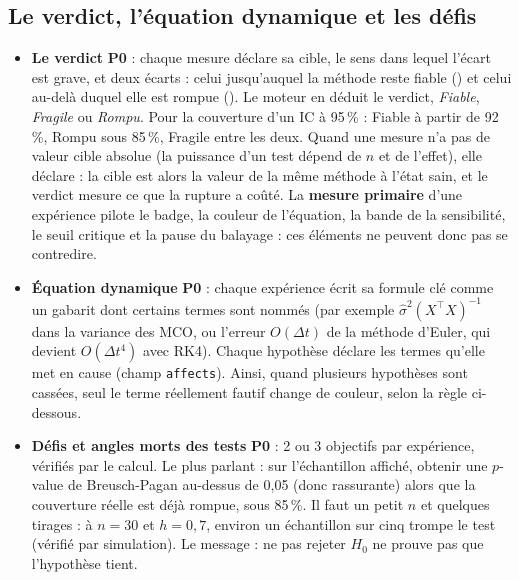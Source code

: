\documentclass[11pt,a4paper]{article}
\newcommand{\pzero}{\colorbox{ctCorrection!18}{\footnotesize\textbf{P0}}}
\begin{document}
\subsection{Le verdict, l'équation dynamique et les défis}\label{sec:verdict}
\begin{itemize}[leftmargin=*]
  \item \textbf{Le verdict} \pzero{} : chaque mesure déclare sa cible, le sens dans lequel l'écart est grave, et deux écarts : celui jusqu'auquel la méthode reste fiable () et celui au-delà duquel elle est rompue (). Le moteur en déduit le verdict, \emph{Fiable}, \emph{Fragile} ou \emph{Rompu}. Pour la couverture d'un IC à 95\,\% : Fiable à partir de 92\,\%, Rompu sous 85\,\%, Fragile entre les deux. Quand une mesure n'a pas de valeur cible absolue (la puissance d'un test dépend de $n$ et de l'effet), elle déclare  : la cible est alors la valeur de la même méthode à l'état sain, et le verdict mesure ce que la rupture a coûté. La \textbf{mesure primaire} d'une expérience pilote le badge, la couleur de l'équation, la bande de la sensibilité, le seuil critique et la pause du balayage : ces éléments ne peuvent donc pas se contredire.
  \item \textbf{Équation dynamique} \pzero{} : chaque expérience écrit sa formule clé comme un gabarit dont certains termes sont nommés (par exemple $\hat{\sigma}^2 (X^\top X)^{-1}$ dans la variance des MCO, ou l'erreur $O(\Delta t)$ de la méthode d'Euler, qui devient $O(\Delta t^4)$ avec RK4). Chaque hypothèse déclare les termes qu'elle met en cause (champ \texttt{affects}). Ainsi, quand plusieurs hypothèses sont cassées, seul le terme réellement fautif change de couleur, selon la règle ci-dessous.
  \item \textbf{Défis et angles morts des tests} \pzero{} : 2 ou 3 objectifs par expérience, vérifiés par le calcul. Le plus parlant : sur l'échantillon affiché, obtenir une $p$-value de Breusch-Pagan au-dessus de 0,05 (donc rassurante) alors que la couverture réelle est déjà rompue, sous 85\,\%. Il faut un petit $n$ et quelques tirages : à $n = 30$ et $h = 0{,}7$, environ un échantillon sur cinq trompe le test (vérifié par simulation). Le message : ne pas rejeter $H_0$ ne prouve pas que l'hypothèse tient.
\end{itemize}
\end{document}
